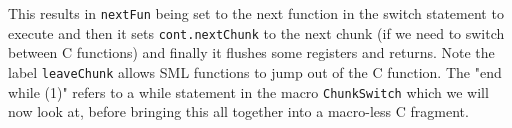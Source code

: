 This results in \texttt{nextFun} being set to the next function in the switch statement to execute and then it sets \texttt{cont.nextChunk} to the next chunk (if we need to switch between C functions) and finally it flushes some registers and returns. Note the label \texttt{leaveChunk} allows SML functions to jump out of the C function. The "end while (1)" refers to a while statement in the macro \texttt{ChunkSwitch} which we will now look at, before bringing this all together into a macro-less C fragment.
